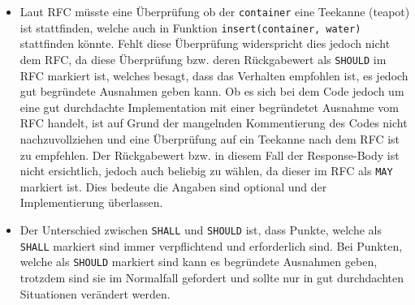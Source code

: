 \documentclass[german,12pt,a4paper]{article}
\begin{document}
\begin{itemize}

	\item Laut RFC müsste eine Überprüfung ob der \texttt{container} eine Teekanne (teapot) ist
	stattfinden, welche auch in Funktion \texttt{insert(container, water)} stattfinden könnte. Fehlt
	diese Überprüfung widerspricht dies jedoch nicht dem RFC, da diese Überprüfung bzw. deren
	Rückgabewert als \texttt{SHOULD} im RFC markiert ist, welches besagt, dass das Verhalten
	empfohlen ist, es jedoch gut begründete Ausnahmen geben kann. Ob es sich bei dem Code jedoch um
	eine gut durchdachte Implementation mit einer begründetet Ausnahme vom RFC handelt, ist auf Grund
	der mangelnden Kommentierung des Codes nicht nachzuvollziehen und eine Überprüfung auf ein
	Teekanne nach dem RFC ist zu empfehlen. Der Rückgabewert bzw. in diesem Fall der Response-Body
	ist nicht ersichtlich, jedoch auch beliebig zu wählen, da dieser im RFC als \texttt{MAY} markiert
	ist. Dies bedeute die Angaben sind optional und der Implementierung überlassen.

	\item Der Unterschied zwischen \texttt{SHALL} und \texttt{SHOULD} ist, dass Punkte, welche als
	\texttt{SHALL} markiert sind immer verpflichtend und erforderlich sind. Bei Punkten, welche als
	\texttt{SHOULD} markiert sind kann es begründete Ausnahmen geben, trotzdem sind sie im Normalfall
	gefordert und sollte nur in gut durchdachten Situationen verändert werden.

\end{itemize}
\end{document}
